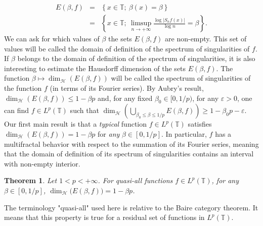 \documentclass[11pt,a4paper]{amsart}
\theoremstyle{plain}
\newtheorem{theorem}{Theorem}[section]
\begin{document}
\begin{eqnarray*}
E(\beta,f)&=&\left\{x\in\mathbb T;\ \beta(x)=\beta\right\}\\
&=&\left\{x\in\mathbb T;\ \limsup_{n\to+\infty}\frac{\log |S_nf(x)|}{\log
    n}=\beta\right\}.
\end{eqnarray*}
We  can ask for which values of $\beta$ the sets
$E(\beta,f)$ are non-empty. This set of values will be called the domain of definition of the spectrum of singularities of $f$.
If $\beta$ belongs to the domain of definition of the spectrum of singularities, it is also interesting to estimate the
Hausdorff dimension of the sets $E(\beta,f)$. The function $\beta\mapsto
\dim_\mathcal{H}(E(\beta,f))$ will be called the spectrum of singularities of the
function $f$ (in terms of its Fourier series). 
By Aubry's result, $\dim_\mathcal{H}(E(\beta,f))\leq1-\beta p$ and, for any fixed $\beta_0\in[0,1/p)$,
for any ${\varepsilon}>0$, one can find 
$f\in L^p({\mathbb T})$ such that $\dim_\mathcal{H}\left(\bigcup_{\beta_0\leq\beta\leq
  1/p}E(\beta,f)\right)\geq 1-\beta_0p-{\varepsilon}$. Our first main result
is that a \emph{typical} function $f\in L^p({\mathbb T})$ satisfies $\dim_\mathcal{H}(E(\beta,f))=1-\beta p$ for \emph{any} $\beta\in[0,1/p]$.
In particular, $f$ has a multifractal behavior with respect to the summation of its Fourier series, meaning that the domain of 
definition of its spectrum of singularities contains an interval with non-empty interior.
\begin{theorem}\label{THMLP}
Let $1<p<+\infty$. For quasi-all functions $f\in L^p({\mathbb T})$, for any $\beta\in[0,1/p]$, $\dim_\mathcal{H}\big(E(\beta,f)\big)=1-\beta p$.
\end{theorem}
The terminology "quasi-all" used here is relative to the Baire category theorem. It means that this property is true for a residual
set of functions in $L^p({\mathbb T})$.

\medskip
\end{document}
